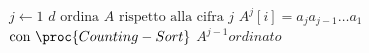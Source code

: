 \begin{codebox}
\li \For $j \gets 1$ \To $d$
\li \Do
		$\text{ordina $A$ rispetto alla cifra $j$}$
			\Comment $A^j[i] = a_j a_{j-1} \dots a_1$
\zi 	$\text{con } \proc{Counting-Sort}$
			\Comment $A^{j-1} ordinato$
	\End
\end{codebox}